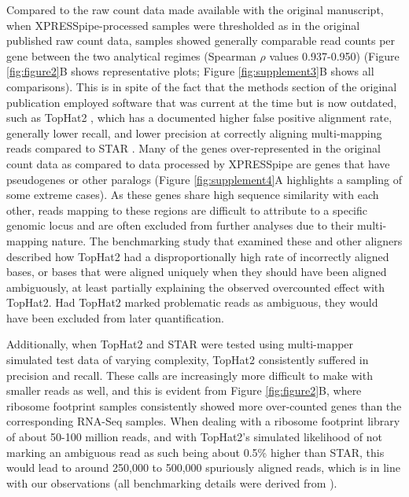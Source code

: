 \documentclass[10pt, oneside]{article}
\begin{document}
Compared to the raw count data made available with the original manuscript, when XPRESSpipe-processed samples were thresholded as in the original published raw count data, samples showed generally comparable read counts per gene between the two analytical regimes (Spearman $\rho$ values 0.937-0.950) (Figure \ref{fig:figure2}B shows representative plots; Figure \ref{fig:supplement3}B shows all comparisons). This is in spite of the fact that the methods section of the original publication employed software that was current at the time but is now outdated, such as TopHat2 \cite{tophat2}, which has a documented higher false positive alignment rate, generally lower recall, and lower precision at correctly aligning multi-mapping reads compared to STAR \cite{alignment_benchmark, star}. Many of the genes over-represented in the original count data as compared to data processed by XPRESSpipe are genes that have pseudogenes or other paralogs (Figure \ref{fig:supplement4}A highlights a sampling of some extreme cases). As these genes share high sequence similarity with each other, reads mapping to these regions are difficult to attribute to a specific genomic locus and are often excluded from further analyses due to their multi-mapping nature. The benchmarking study \cite{alignment_benchmark} that examined these and other aligners described how TopHat2 had a disproportionally high rate of incorrectly aligned bases, or bases that were aligned uniquely when they should have been aligned ambiguously, at least partially explaining the observed overcounted effect with TopHat2. Had TopHat2 marked problematic reads as ambiguous, they would have been excluded from later quantification. \par

Additionally, when TopHat2 and STAR were tested using multi-mapper simulated test data of varying complexity, TopHat2 consistently suffered in precision and recall. These calls are increasingly more difficult to make with smaller reads as well, and this is evident from Figure \ref{fig:figure2}B, where ribosome footprint samples consistently showed more over-counted genes than the corresponding RNA-Seq samples. When dealing with a ribosome footprint library of about 50-100 million reads, and with TopHat2's simulated likelihood of not marking an ambiguous read as such being about 0.5\% higher than STAR, this would lead to around 250,000 to 500,000 spuriously aligned reads, which is in line with our observations (all benchmarking details were derived from \cite{alignment_benchmark}). \par
\end{document}
